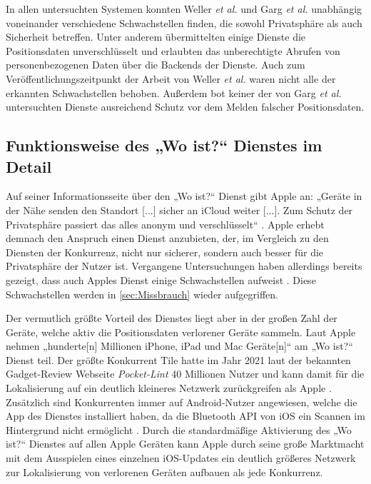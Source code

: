 In allen untersuchten Systemen konnten Weller \textit{et al.} \cite{Weller_BLE_Finders} und Garg \textit{et al.} \cite{Garg_Secure_Tracker} unabhängig voneinander verschiedene Schwachstellen finden, die sowohl Privatsphäre als auch Sicherheit betreffen.
Unter anderem übermittelten einige Dienste die Positionsdaten unverschlüsselt und erlaubten das unberechtigte Abrufen von personenbezogenen Daten über die Backends der Dienste.
Auch zum Veröffentlichungszeitpunkt der Arbeit von Weller \textit{et al.} \cite{Weller_BLE_Finders} waren nicht alle der erkannten Schwachstellen behoben.
Außerdem bot keiner der von Garg \textit{et al.} \cite{Garg_Secure_Tracker} untersuchten Dienste ausreichend Schutz vor dem Melden falscher Positionsdaten.


\subsection{Funktionsweise des „Wo ist?“ Dienstes im Detail}
\label{sec:Funktionsweise_FindMy}
Auf seiner Informationsseite über den „Wo ist?“ Dienst gibt Apple an: „Geräte in der Nähe senden den Standort [...] sicher an iCloud weiter [...]. Zum Schutz der Privatsphäre passiert das alles anonym und verschlüsselt“ \cite{Apple_WoIst}.
Apple erhebt demnach den Anspruch einen Dienst anzubieten, der, im Vergleich zu den Diensten der Konkurrenz, nicht nur sicherer, sondern auch besser für die Privatsphäre der Nutzer ist.
Vergangene Untersuchungen haben allerdings bereits gezeigt, dass auch Apples Dienst einige Schwachstellen aufweist \cite{Heinrich_FindMy,Tonetto_FindMy}.
Diese Schwachstellen werden in \autoref{sec:Missbrauch} wieder aufgegriffen.

Der vermutlich größte Vorteil des Dienstes liegt aber in der großen Zahl der Geräte, welche aktiv die Positionsdaten verlorener Geräte sammeln.
Laut Apple nehmen „hunderte[n] Millionen iPhone, iPad und Mac Geräte[n]“ \cite{Apple_WoIst} am „Wo ist?“ Dienst teil.
Der größte Konkurrent Tile hatte im Jahr 2021 laut der bekannten Gadget-Review Webseite \textit{Pocket-Lint} 40 Millionen Nutzer und kann damit für die Lokalisierung auf ein deutlich kleineres Netzwerk zurückgreifen als Apple \cite{Tile_Network}.
Zusätzlich sind Konkurrenten immer auf Android-Nutzer angewiesen, welche die App des Dienstes installiert haben, da die Bluetooth \ac{API} von iOS ein Scannen im Hintergrund nicht ermöglicht \cite{Heinrich_AirGuard}.
Durch die standardmäßige Aktivierung des „Wo ist?“ Dienstes auf allen Apple Geräten kann Apple durch seine große Marktmacht mit dem Ausspielen eines einzelnen iOS-Updates ein deutlich größeres Netzwerk zur Lokalisierung von verlorenen Geräten aufbauen als jede Konkurrenz.


